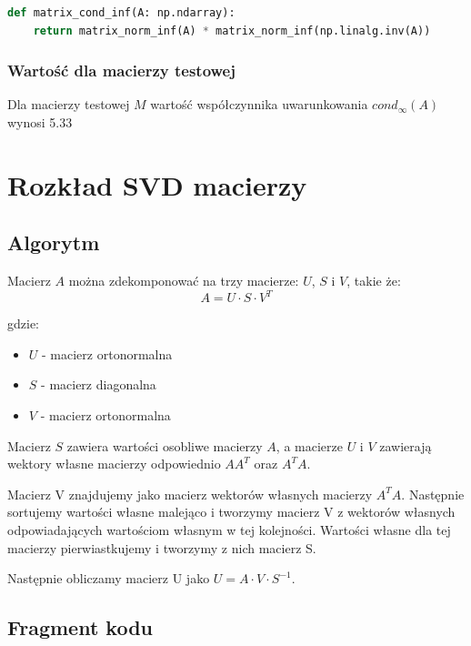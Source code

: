 \documentclass[a4paper]{article}
\begin{document}
\begin{lstlisting}[language=python]
def matrix_cond_inf(A: np.ndarray):
    return matrix_norm_inf(A) * matrix_norm_inf(np.linalg.inv(A))
\end{lstlisting}

\subsubsection{Wartość dla macierzy testowej}

Dla macierzy testowej $M$ wartość współczynnika uwarunkowania $cond_{\infty}(A)$ wynosi 5.33

\section{Rozkład SVD macierzy}

\subsection{Algorytm}

Macierz \(A\) można zdekomponować na trzy macierze: \(U\), \(S\) i \(V\), takie że:
\[
    A = U \cdot S \cdot V^T
\]

gdzie:
\begin{itemize}
    \item \(U\) - macierz ortonormalna
    \item \(S\) - macierz diagonalna
    \item \(V\) - macierz ortonormalna
\end{itemize}

Macierz \(S\) zawiera wartości osobliwe macierzy \(A\), a macierze \(U\) i \(V\)
zawierają wektory własne macierzy odpowiednio $A A^T $ oraz $A^T  A$.

Macierz V znajdujemy jako macierz wektorów własnych macierzy \(A^T A\).
Następnie sortujemy wartości własne malejąco i tworzymy macierz V z wektorów własnych
odpowiadających wartościom własnym w tej kolejności. Wartości własne dla tej macierzy
pierwiastkujemy i tworzymy z nich macierz S.

Następnie obliczamy macierz U jako \(U = A \cdot V \cdot S^{-1}\).

\subsection{Fragment kodu}
\end{document}
